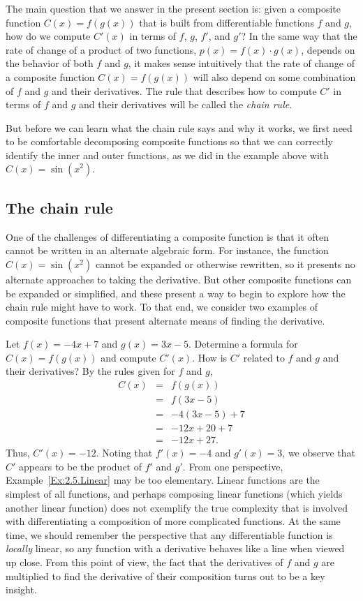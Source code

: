 The main question that we answer in the present section is: given a composite function $C(x) = f(g(x))$ that is built from differentiable functions $f$ and $g$, how do we compute $C'(x)$ in terms of $f$, $g$, $f'$, and $g'$?  In the same way that the rate of change of a product of two functions, $p(x) = f(x) \cdot g(x)$, depends on the behavior of both $f$ and $g$, it makes sense intuitively that the rate of change of a composite function $C(x) = f(g(x))$ will also depend on some combination of $f$ and $g$ and their derivatives.  The rule that describes how to compute $C'$ in terms of $f$ and $g$ and their derivatives will be called the \emph{chain rule}.

But before we can learn what the chain rule says and why it works, we first need to be comfortable decomposing composite functions so that we can correctly identify the inner and outer functions, as we did in the example above with $C(x) = \sin(x^2).$ 



\subsection*{The chain rule}

One of the challenges of differentiating a composite function is that it often cannot be written in an alternate algebraic form.  For instance, the function $C(x) = \sin(x^2)$ cannot be expanded or otherwise rewritten, so it presents no alternate approaches to taking the derivative.  But other composite functions can be expanded or simplified, and these present a way to begin to explore how the chain rule might have to work.  To that end, we consider two examples of composite functions that present alternate means of finding the derivative.

\bex \label{Ex:2.5.Linear}
Let $f(x) = -4x + 7$ and $g(x) = 3x - 5$.  Determine a formula for $C(x) = f(g(x))$ and compute $C'(x)$.  How is $C'$ related to $f$ and $g$ and their derivatives?
\eex
By the rules given for $f$ and $g$, 
\begin{eqnarray*}
C(x) & = & f(g(x)) \\
       & = & f(3x-5) \\
       & = & -4(3x-5) + 7 \\
       & = & -12x + 20 + 7 \\
       & = & -12x + 27.
\end{eqnarray*}
Thus, $C'(x) = -12$.  Noting that $f'(x) = -4$ and $g'(x) = 3$, we observe that $C'$ appears to be the product of $f'$ and $g'$.
\afterex
From one perspective, Example~\ref{Ex:2.5.Linear} may be too elementary.  Linear functions are the simplest of all functions, and perhaps composing linear functions (which yields another linear function) does not exemplify the true complexity that is involved with differentiating a composition of more complicated functions.  At the same time, we should remember the perspective that any differentiable function is \emph{locally} linear, so any function with a derivative behaves like a line when viewed up close.  From this point of view, the fact that the derivatives of $f$ and $g$ are multiplied to find the derivative of their composition turns out to be a key insight.

